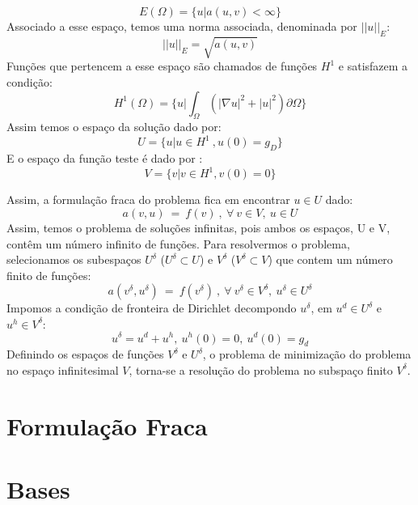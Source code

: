 \begin{equation}
 E(\Omega) = \lbrace u | a(u,v) < \infty \rbrace
\end{equation}
  Associado a esse espaço, temos uma norma associada, denominada por $||u||_E$:
\begin{equation}
 ||u||_{E} = \sqrt{a(u,v)}
\end{equation}
 Funções que pertencem a esse espaço são chamados de funções $H^1$ e satisfazem a condição:
 \begin{equation}
 H^1(\Omega) = \bigg\{ u| \int_\Omega (|\nabla u|^2 + |u|^2) \partial \Omega  \bigg\}
 \end{equation}
  Assim temos o espaço da solução dado por:
\begin{equation}
U = \lbrace u| u \in H^1\ , u(0) = g_D  \rbrace
\end{equation}
 E o espaço da função teste é dado por :
\begin{equation}
V = \lbrace v | v \in H^1, v(0)=0 \rbrace
\end{equation}

 Assim, a formulação fraca do problema fica em encontrar $u \in U$ dado:
 \begin{equation}
 a(v,u)\ =\ f(v)\ ,\ \forall\ v \in V,\ u \in U
 \end{equation}
 Assim, temos o problema de soluções infinitas, pois ambos os espaços, U e V, contêm um número infinito de funções. Para resolvermos o problema, selecionamos os subespaços $U^\delta$ ($ U^\delta \subset U$) e $V^\delta$ ($ V^\delta \subset V$) que contem um número finito de funções:
  \begin{equation}
 a(v^\delta,u^\delta)\ =\ f(v^\delta)\ ,\ \forall\ v^\delta \in V^\delta,\ u^\delta \in U^\delta
 \end{equation}
Impomos a condição de fronteira de Dirichlet decompondo $u^\delta$, em $u^d \in U^\delta$ e $u^h \in V^\delta$:
\begin{equation}
 u^\delta = u^d + u^h,\ u^h(0) = 0,\ u^d(0) = g_d
\end{equation}
 Definindo os espaços de funções $V^\delta$ e $U^\delta$, o problema de minimização do problema no espaço infinitesimal $V$, torna-se a resolução do problema no subspaço finito $V^\delta$.
 
\section{Formulação Fraca}
\section{Bases}
